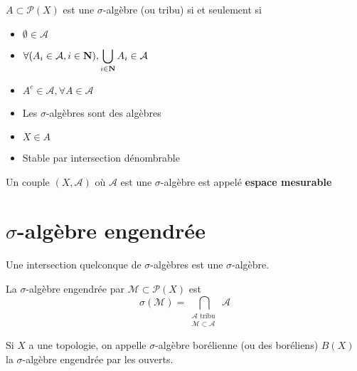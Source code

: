 \begin{dfn}
    $A\subset \mathcal  P(X)$ est une $\sigma$-algèbre (ou tribu) si et seulement si
    \begin{itemize}
        \item $\emptyset \in  \mathcal  A$
        \item $\displaystyle \forall  (A_i \in  \mathcal A, i \in  \mathbf N), \bigcup_{i \in  \mathbf N} A_i \in  \mathcal  A$
        \item $A^c \in  \mathcal  A, \forall  A \in  \mathcal  A$
    \end{itemize}
\end{dfn}

\begin{rem}
\begin{itemize}
    \item Les $\sigma$-algèbres sont des algèbres
    \item $X \in  A$
    \item Stable par intersection dénombrable
\end{itemize}
\end{rem}

\begin{dfn}
    Un couple $(X, \mathcal  A)$ où $\mathcal  A$ est une $\sigma$-algèbre est appelé \textbf{espace mesurable}
\end{dfn}

\section{\texorpdfstring{$\sigma$}{sigma}-algèbre  engendrée}

\begin{lmm}
Une intersection quelconque de $\sigma$-algèbres est une $\sigma$-algèbre.
\end{lmm}

\begin{dfn}
    La $\sigma$-algèbre engendrée par  $\mathcal  M \subset \mathcal  P(X)$ est \[
        \sigma(\mathcal  M)=\bigcap_{\substack{\mathcal A \text{ tribu }\\ \mathcal  M \subset \mathcal  A}}\mathcal  A
    \] 
\end{dfn}

\begin{dfn}[Boréliens]
    Si $X$ a une topologie, on appelle  $\sigma$-algèbre borélienne (ou des boréliens)  $B(X)$ la  $\sigma$-algèbre engendrée par les ouverts.
\end{dfn}

